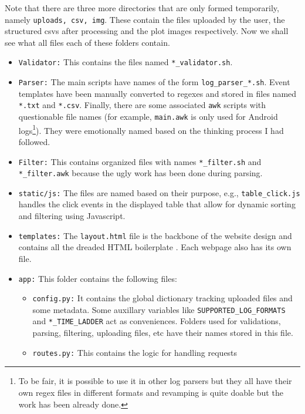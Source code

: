 \documentclass[11pt]{scrartcl}
\begin{document}
Note that there are three more directories that are only formed temporarily,
namely \texttt{uploads, csv, img}. These contain the files uploaded by the user,
the structured csvs after processing and the plot images respectively.
Now we shall see what all files each of these folders contain.

\begin{itemize}
  \item \texttt{Validator:} This contains the files named
    \texttt{*\_validator.sh}.
  \item \texttt{Parser:} The main scripts have names of the form
    \texttt{log\_parser\_*.sh}. Event templates have been manually converted to
    regexes and stored in files named \texttt{*.txt} and \texttt{*.csv}.
    Finally, there are some associated \texttt{awk} scripts with questionable
    file names (for example, \texttt{main.awk} is only used for Android
    logs\footnote{To be fair, it is possible to use it in other log parsers but
    they all have their own regex files in different formats and revamping is
    quite doable but the work has been already done.}). They were emotionally
    named based on the thinking process I had followed.
  \item \texttt{Filter:} This contains organized files with names
    \texttt{*\_filter.sh} and \texttt{*\_filter.awk} because the ugly work has
    been done during parsing.
  \item \texttt{static/js:} The files are named based on their purpose, e.g.,
    \texttt{table\_click.js} handles the click events in the displayed table
    that allow for dynamic sorting and filtering using Javascript.
  \item \texttt{templates:} The \texttt{layout.html} file is the backbone of the
    website design and contains all the dreaded HTML boilerplate . Each
    webpage also has its own file.
  \item \texttt{app:} This folder contains the following files:
    \begin{itemize}
      \item \texttt{config.py:} It contains the global dictionary tracking
        uploaded files and some metadata. Some auxillary variables like
        \texttt{SUPPORTED\_LOG\_FORMATS} and \texttt{*\_TIME\_LADDER} act
        as conveniences. Folders used for validations, parsing, filtering,
        uploading files, etc have their names stored in this file.
      \item \texttt{routes.py:} This contains the logic for handling requests

\end{itemize}
\end{itemize}
\end{document}
